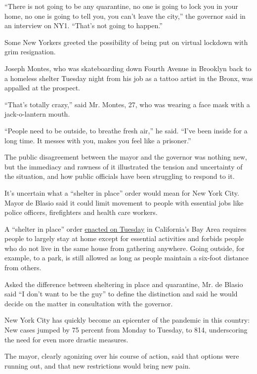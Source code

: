 ``There is not going to be any quarantine, no one is going to lock you
in your home, no one is going to tell you, you can't leave the city,''
the governor said in an interview on NY1. ``That's not going to
happen.''

Some New Yorkers greeted the possibility of being put on virtual
lockdown with grim resignation.

Joseph Montes, who was skateboarding down Fourth Avenue in Brooklyn back
to a homeless shelter Tuesday night from his job as a tattoo artist in
the Bronx, was appalled at the prospect.

``That's totally crazy,'' said Mr. Montes, 27, who was wearing a face
mask with a jack-o-lantern mouth.

``People need to be outside, to breathe fresh air,'' he said. ``I've
been inside for a long time. It messes with you, makes you feel like a
prisoner.''

The public disagreement between the mayor and the governor was nothing
new, but the immediacy and rawness of it illustrated the tension and
uncertainty of the situation, and how public officials have been
struggling to respond to it.

It's uncertain what a ``shelter in place'' order would mean for New York
City. Mayor de Blasio said it could limit movement to people with
essential jobs like police officers, firefighters and health care
workers.

A ``shelter in place'' order
\href{https://www.nytimes3xbfgragh.onion/2020/03/17/us/shelter-in-place-order-bay-area.html}{enacted
on Tuesday} in California's Bay Area requires people to largely stay at
home except for essential activities and forbids people who do not live
in the same house from gathering anywhere. Going outside, for example,
to a park, is still allowed as long as people maintain a six-foot
distance from others.

Asked the difference between sheltering in place and quarantine, Mr. de
Blasio said ``I don't want to be the guy'' to define the distinction and
said he would decide on the matter in consultation with the governor.

New York City has quickly become an epicenter of the pandemic in this
country: New cases jumped by 75 percent from Monday to Tuesday, to 814,
underscoring the need for even more drastic measures.

The mayor, clearly agonizing over his course of action, said that
options were running out, and that new restrictions would bring new
pain.

